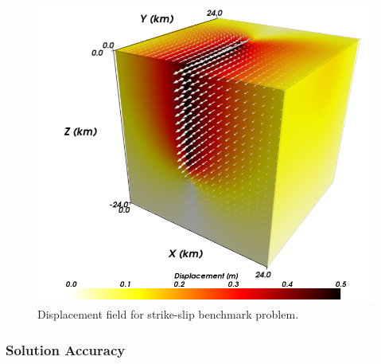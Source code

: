 \begin{figure}
\begin{centering}
\includegraphics[scale=0.33]{benchmarks/strikeslip/figs/soln}
\par\end{centering}

\caption{Displacement field for strike-slip benchmark problem.\label{fig:benchmark:strikeslip:solution}}
\end{figure}



\subsubsection{Solution Accuracy}

